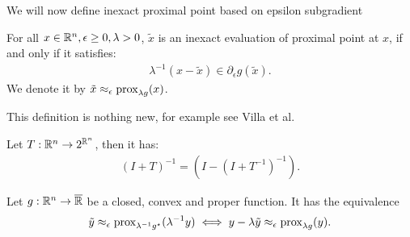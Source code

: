 \documentclass[12pt]{article}
\begin{document}
        We will now define inexact proximal point based on epsilon subgradient
        \begin{definition}
            For all $x \in \mathbb R^n, \epsilon \ge 0, \lambda > 0$, $\tilde x$ is an inexact evaluation of proximal point at $x$, if and only if it satisfies: 
            \begin{align*}
                \lambda^{-1}(x - \tilde x) \in \partial_{\epsilon} g(\tilde x). 
            \end{align*}
            We denote it by $\tilde x \approx_\epsilon \operatorname{prox}_{\lambda g}(x)$. 
        \end{definition}
        \begin{remark}
            This definition is nothing new, for example see Villa et al. \cite[Definition 2.1]{villa_accelerated_2013}
        \end{remark}
        \begin{fact}\label{fact:resv-identity}
            Let $T: \mathbb R^n \rightarrow 2^{\mathbb R^n}$, then it has: 
            \begin{align*}
                (I + T)^{-1} = (I - (I + T^{-1})^{-1}).
            \end{align*}
        \end{fact}
        \begin{theorem}
            Let $g: \mathbb R^n \rightarrow \overline {\mathbb R}$ be a closed, convex and proper function. 
            It has the equivalence
            \begin{align*}
                \tilde y \approx_\epsilon \operatorname{prox}_{\lambda^{-1}g^\star}(\lambda^{-1}y)
                \iff 
                y - \lambda \tilde y \approx_\epsilon \operatorname{prox}_{\lambda g}(y). 
            \end{align*}
        \end{theorem}
\end{document}
